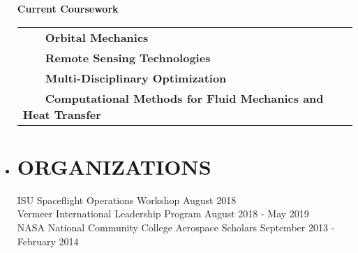 \documentclass[overlapped, 11pt]{res}
\newcommand{\tabitem}{~~\textbullet~~}
\begin{document}
\begin{resume}
\begin{itemize}
             \textbf{Current Coursework} \\
                \begin{tabular}{l}
                    \tabitem \textbf{Orbital Mechanics} \\
                    \tabitem \textbf{Remote Sensing Technologies} \\
                    \tabitem \textbf{Multi-Disciplinary Optimization} \\
                    \tabitem \textbf{Computational Methods for Fluid Mechanics and Heat Transfer} \\
                \end{tabular}

        \item[]\section{ORGANIZATIONS}
            ISU Spaceflight Operations Workshop
                \hfill August 2018 \\
            Vermeer International Leadership Program
                \hfill August 2018 - May 2019 \\
            NASA National Community College Aerospace Scholars
                \hfill September 2013 - February 2014
        
        \end{itemize}
    \end{resume}
\end{document}
